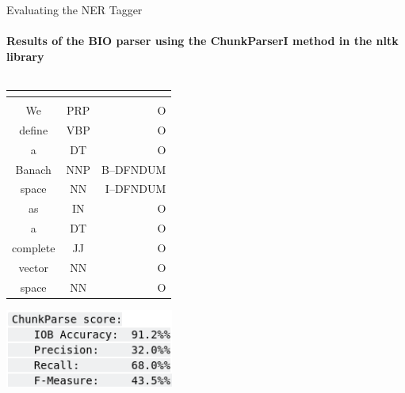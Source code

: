 \documentclass[10pt]{beamer}
\begin{document}
\begin{frame}{Evaluating the NER Tagger} 
    \framesubtitle{Results of the BIO parser using the ChunkParserI method in the \textbf{nltk} library}
    \begin{columns}[T]
        \begin{column}{0.5\textwidth}
            \begin{tabular}{|c|c|r|}
                \hline
                \hline
        \multicolumn{2}{|c|}{\color{blue}{Input}} & \color{purple}{Output} \\
                \hline
                \hline
                \color{blue}{Token} & \color{blue}{POS} & \color{purple}{NER}\\
                \hline
                  We&PRP&O\\
                  \hline
                  define&VBP&O\\
                  \hline
                  a&DT&O\\
                  \hline
                  Banach&NNP&B--DFNDUM\\
                  \hline
                  space&NN&I--DFNDUM\\
                  \hline
                  as&IN&O\\
                  \hline
                  a&DT&O\\
                  \hline
                  complete&JJ&O\\
                  \hline
                  vector&NN&O\\
                  \hline
                  space&NN&O\\
                  \hline
            \end{tabular}
    \includegraphics[width=0.6\textwidth]{BIO_stats.png}
        \end{column}
        \begin{column}{0.5\textwidth}
            
        \end{column}
    \end{columns}
\end{frame}
\end{document}
